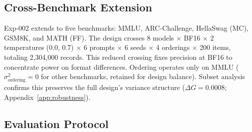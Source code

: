 \begin{table}[t]
\centering
\caption{Fully crossed G-theory design. Exp-001 evaluates MMLU across all facet levels; exp-002 extends to five benchmarks with reduced crossing. $^\dagger$BF16 balanced subset (2 temperatures: 0.0, 0.7) for cross-model analysis; the full single-model design uses all 3 levels.}
\label{tab:design_matrix}
\small
{}
\end{table}


\subsection{Cross-Benchmark Extension}
\label{sec:exp002}

Exp-002 extends to five benchmarks: MMLU, ARC-Challenge, HellaSwag (MC), GSM8K, and MATH (FF). The design crosses 8 models $\times$ BF16 $\times$ 2 temperatures (0.0, 0.7) $\times$ 6 prompts $\times$ 6 seeds $\times$ 4 orderings $\times$ 200 items, totaling 2,304,000 records. This reduced crossing fixes precision at BF16 to concentrate power on format differences. Ordering operates only on MMLU ($\sigma^2_{\text{ordering}} = 0$ for other benchmarks, retained for design balance). Subset analysis confirms this preserves the full design's variance structure ($\Delta G = 0.0008$; Appendix~\ref{app:robustness}).


\subsection{Evaluation Protocol}
\label{sec:protocol}

